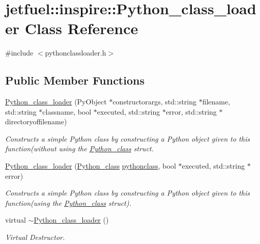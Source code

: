 \hypertarget{classjetfuel_1_1inspire_1_1Python__class__loader}{}\section{jetfuel\+:\+:inspire\+:\+:Python\+\_\+class\+\_\+loader Class Reference}
\label{classjetfuel_1_1inspire_1_1Python__class__loader}


{\ttfamily \#include $<$pythonclassloader.\+h$>$}

\subsection*{Public Member Functions}
\begin{DoxyCompactItemize}
\item 
\hyperlink{classjetfuel_1_1inspire_1_1Python__class__loader_ae8e3d2e3e2b95a5463f5735f2c0f6be2}{Python\+\_\+class\+\_\+loader} (Py\+Object $\ast$constructorargs, std\+::string $\ast$filename, std\+::string $\ast$classname, bool $\ast$executed, std\+::string $\ast$error, std\+::string $\ast$directoryoffilename)
\begin{DoxyCompactList}\small\item\em Constructs a simple Python class by constructing a Python object given to this function(without using the \hyperlink{structjetfuel_1_1inspire_1_1Python__class}{Python\+\_\+class} struct. \end{DoxyCompactList}\item 
\hyperlink{classjetfuel_1_1inspire_1_1Python__class__loader_a5c52b32bf4e0d5692a20dc652d872da8}{Python\+\_\+class\+\_\+loader} (\hyperlink{structjetfuel_1_1inspire_1_1Python__class}{Python\+\_\+class} \hyperlink{classjetfuel_1_1inspire_1_1Python__class__loader_adbcf46681199db320a6b09aec18a2ca8}{pythonclass}, bool $\ast$executed, std\+::string $\ast$error)
\begin{DoxyCompactList}\small\item\em Constructs a simple Python class by constructing a Python object given to this function(using the \hyperlink{structjetfuel_1_1inspire_1_1Python__class}{Python\+\_\+class} struct). \end{DoxyCompactList}\item 
virtual \hyperlink{classjetfuel_1_1inspire_1_1Python__class__loader_af211621190c98b14234cd23f7f34aeb9}{$\sim$\+Python\+\_\+class\+\_\+loader} ()
\begin{DoxyCompactList}\small\item\em Virtual Destructor. \end{DoxyCompactList}\end{DoxyCompactItemize}
